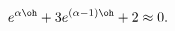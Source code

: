 \begin{equation} \label{asymptotic-qnf-reissner-nordstrom-4d-rewritten}
e^{\alpha \oh} + 3 e^{(\alpha-1) \oh} + 2 \approx 0.
\end{equation}

